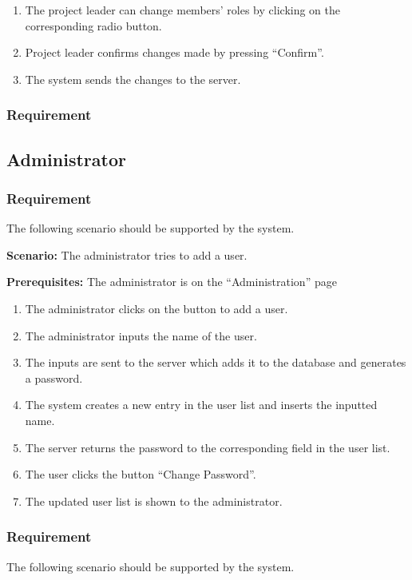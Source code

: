 \documentclass{article}
\begin{document}
\begin{enumerate}
    \item The project leader can change members' roles by clicking on the corresponding radio button.
    \item Project leader confirms changes made by pressing “Confirm”.
    \item The system sends the changes to the server.
    
\end{enumerate}

\subsubsection{Requirement}

\subsection{Administrator}
\subsubsection{Requirement}
The following scenario should be supported by the system.

\textbf{Scenario:} The administrator tries to add a user.

\textbf{Prerequisites:} The administrator is on the “Administration” page

\begin{enumerate}
    \item The administrator clicks on the button to add a user.
    \item The administrator inputs the name of the user.
    \item The inputs are sent to the server which adds it to the database and generates a password.
    \item The system creates a new entry in the user list and inserts the inputted name.
    \item The server returns the password to the corresponding field in the user list.
    \item The user clicks the button “Change Password”.
    \item The updated user list is shown to the administrator.
\end{enumerate}

\subsubsection{Requirement}
The following scenario should be supported by the system.
\end{document}
